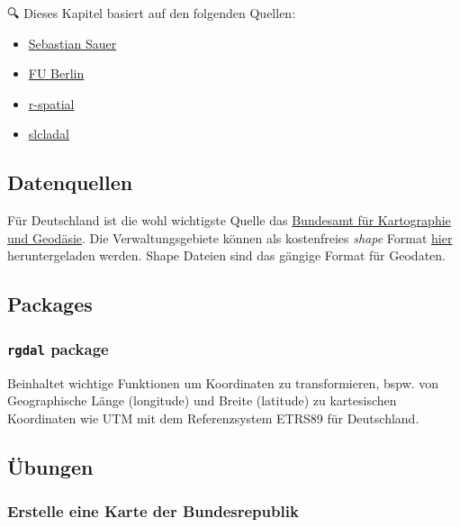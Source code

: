\documentclass[
]{article}
\providecommand{\tightlist}{%
  \setlength{\itemsep}{0pt}\setlength{\parskip}{0pt}}
\begin{document}
🔍 Dieses Kapitel basiert auf den folgenden Quellen:

\begin{itemize}
\tightlist
\item
  \href{https://sebastiansauer.github.io/unemp-map/}{Sebastian Sauer}
\item
  \href{https://www.geo.fu-berlin.de/en/v/soga/Introduction-to-R/Spatial-Data/index.html}{FU Berlin}
\item
  \href{https://www.r-spatial.org/r/2018/10/25/ggplot2-sf-2.html}{r-spatial}
\item
  \href{https://slcladal.github.io/maps.html}{slcladal}
\end{itemize}

\hypertarget{datenquellen}{%
\subsection{Datenquellen}\label{datenquellen}}

Für Deutschland ist die wohl wichtigste Quelle das \href{https://www.bkg.bund.de/DE/Home/home.html}{Bundesamt für Kartographie und Geodäsie}. Die Verwaltungsgebiete können als kostenfreies \emph{shape} Format \href{https://gdz.bkg.bund.de/index.php/default/open-data/verwaltungsgebiete-historisch-vg-hist.html}{hier} heruntergeladen werden. Shape Dateien sind das gängige Format für Geodaten.

\hypertarget{packages}{%
\subsection{Packages}\label{packages}}

\hypertarget{rgdal-package}{%
\subsubsection{\texorpdfstring{\texttt{rgdal} package}{rgdal package}}\label{rgdal-package}}

Beinhaltet wichtige Funktionen um Koordinaten zu transformieren, bspw. von Geographische Länge (longitude) und Breite (latitude) zu kartesischen Koordinaten wie UTM mit dem Referenzsystem ETRS89 für Deutschland.

\hypertarget{uxfcbungen}{%
\subsection{Übungen}\label{uxfcbungen}}

\hypertarget{erstelle-eine-karte-der-bundesrepublik}{%
\subsubsection{Erstelle eine Karte der Bundesrepublik}\label{erstelle-eine-karte-der-bundesrepublik}}
\end{document}

